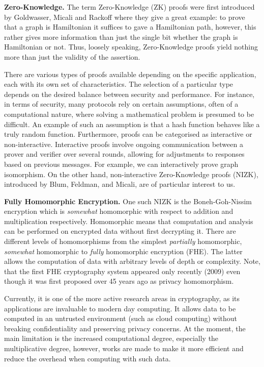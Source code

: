 \documentclass{Resources/UoBLab1}
\theoremstyle{definition}
\begin{document}
\noindent\textbf{Zero-Knowledge.} The term Zero-Knowledge (ZK) proofs were first introduced by Goldwasser, Micali and Rackoff\cite{ZKOrigin} where they give a great example: to prove that a graph is Hamiltonian it suffices to gave a Hamiltonian path, however, this rather gives more information than just the single bit whether the graph is Hamiltonian or not. Thus, loosely speaking, Zero-Knowledge proofs yield nothing more than just the validity of the assertion.

There are various types of proofs available depending on the specific application, each with its own set of characteristics. The selection of a particular type depends on the desired balance between security and performance. For instance, in terms of security, many protocols rely on certain assumptions, often of a computational nature, where solving a mathematical problem is presumed to be difficult. An example of such an assumption is that a hash function behaves like a truly random function\cite{RNGZK}. Furthermore, proofs can be categorised as interactive or non-interactive. Interactive proofs involve ongoing communication between a prover and verifier over several rounds, allowing for adjustments to responses based on previous messages. For example, we can interactively prove graph isomorphism\cite{ZKProofSystemsBook}. On the other hand, non-interactive Zero-Knowledge proofs (NIZK), introduced by Blum, Feldman, and Micali, are of particular interest to us.\medskip

\noindent\textbf{Fully Homomorphic Encryption.} One such NIZK is the Boneh-Goh-Nissim\cite{BGNCipher} encryption which is \textit{somewhat} homomorphic with respect to addition and multiplication respectively. Homomorphic means that computation and analysis can be performed on encrypted data without first decrypting it. There are different levels of homomorphisms from the simplest \textit{partially} homomorphic, \textit{somewhat} homomorphic to \textit{fully} homomorphic encryption (FHE). The latter allows the computation of data with arbitrary levels of depth or complexity\cite{FHEPHD}. Note, that the first FHE cryptography system appeared only recently (2009\cite{FHEPHD}) even though it was first proposed over 45 years ago\cite{FHEMention} as privacy homomorphism.

Currently, it is one of the more active research areas in cryptography, as its applications are invaluable to modern day computing. It allows data to be computed in an untrusted environment (such as cloud computing) without breaking confidentiality and preserving privacy concerns. At the moment, the main limitation is the increased computational degree, especially the multiplicative degree, however, works are made to make it more efficient and reduce the overhead when computing with such data\cite{FHEImprovement1}\cite{FHEImprovement2}.\medskip
\end{document}

